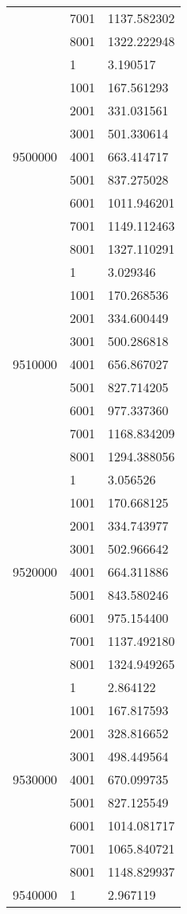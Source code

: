 \begin{table}[htb!]
\begin{tabular}{lll}
 & 7001 & 1137.582302 \\
 & 8001 & 1322.222948 \\
\multirow[c]{9}{*}{9500000} & 1 & 3.190517 \\
 & 1001 & 167.561293 \\
 & 2001 & 331.031561 \\
 & 3001 & 501.330614 \\
 & 4001 & 663.414717 \\
 & 5001 & 837.275028 \\
 & 6001 & 1011.946201 \\
 & 7001 & 1149.112463 \\
 & 8001 & 1327.110291 \\
\multirow[c]{9}{*}{9510000} & 1 & 3.029346 \\
 & 1001 & 170.268536 \\
 & 2001 & 334.600449 \\
 & 3001 & 500.286818 \\
 & 4001 & 656.867027 \\
 & 5001 & 827.714205 \\
 & 6001 & 977.337360 \\
 & 7001 & 1168.834209 \\
 & 8001 & 1294.388056 \\
\multirow[c]{9}{*}{9520000} & 1 & 3.056526 \\
 & 1001 & 170.668125 \\
 & 2001 & 334.743977 \\
 & 3001 & 502.966642 \\
 & 4001 & 664.311886 \\
 & 5001 & 843.580246 \\
 & 6001 & 975.154400 \\
 & 7001 & 1137.492180 \\
 & 8001 & 1324.949265 \\
\multirow[c]{9}{*}{9530000} & 1 & 2.864122 \\
 & 1001 & 167.817593 \\
 & 2001 & 328.816652 \\
 & 3001 & 498.449564 \\
 & 4001 & 670.099735 \\
 & 5001 & 827.125549 \\
 & 6001 & 1014.081717 \\
 & 7001 & 1065.840721 \\
 & 8001 & 1148.829937 \\
\multirow[c]{9}{*}{9540000} & 1 & 2.967119 \\

\end{tabular}
\end{table}
